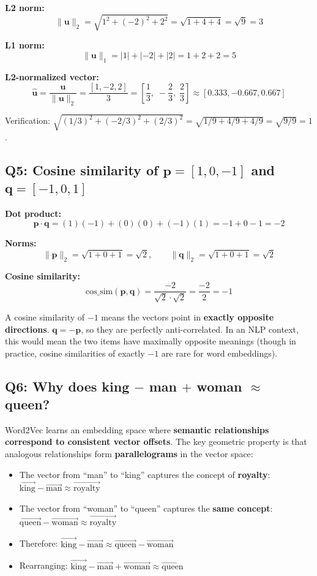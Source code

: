 \documentclass[11pt,a4paper]{article}
\begin{document}
\textbf{L2 norm:}
\[
\|\mathbf{u}\|_2 = \sqrt{1^2 + (-2)^2 + 2^2} = \sqrt{1 + 4 + 4} = \sqrt{9} = 3
\]

\textbf{L1 norm:}
\[
\|\mathbf{u}\|_1 = |1| + |-2| + |2| = 1 + 2 + 2 = 5
\]

\textbf{L2-normalized vector:}
\[
\hat{\mathbf{u}} = \frac{\mathbf{u}}{\|\mathbf{u}\|_2} = \frac{[1, -2, 2]}{3} = \left[\frac{1}{3},\; -\frac{2}{3},\; \frac{2}{3}\right] \approx [0.333, -0.667, 0.667]
\]

Verification: $\sqrt{(1/3)^2 + (-2/3)^2 + (2/3)^2} = \sqrt{1/9 + 4/9 + 4/9} = \sqrt{9/9} = 1$. \checkmark

\subsection*{Q5: Cosine similarity of $\mathbf{p} = [1, 0, -1]$ and $\mathbf{q} = [-1, 0, 1]$}

\textbf{Dot product:}
\[
\mathbf{p} \cdot \mathbf{q} = (1)(-1) + (0)(0) + (-1)(1) = -1 + 0 - 1 = -2
\]

\textbf{Norms:}
\[
\|\mathbf{p}\|_2 = \sqrt{1 + 0 + 1} = \sqrt{2}, \qquad \|\mathbf{q}\|_2 = \sqrt{1 + 0 + 1} = \sqrt{2}
\]

\textbf{Cosine similarity:}
\[
\text{cos\_sim}(\mathbf{p}, \mathbf{q}) = \frac{-2}{\sqrt{2} \cdot \sqrt{2}} = \frac{-2}{2} = -1
\]

A cosine similarity of $-1$ means the vectors point in \textbf{exactly opposite directions}. $\mathbf{q} = -\mathbf{p}$, so they are perfectly anti-correlated. In an NLP context, this would mean the two items have maximally opposite meanings (though in practice, cosine similarities of exactly $-1$ are rare for word embeddings).

\subsection*{Q6: Why does king $-$ man $+$ woman $\approx$ queen?}

Word2Vec learns an embedding space where \textbf{semantic relationships correspond to consistent vector offsets}. The key geometric property is that analogous relationships form \textbf{parallelograms} in the vector space:

\begin{itemize}[leftmargin=1.5em]
    \item The vector from ``man'' to ``king'' captures the concept of \textbf{royalty}: $\vec{\text{king}} - \vec{\text{man}} \approx \vec{\text{royalty}}$
    \item The vector from ``woman'' to ``queen'' captures the \textbf{same concept}: $\vec{\text{queen}} - \vec{\text{woman}} \approx \vec{\text{royalty}}$
    \item Therefore: $\vec{\text{king}} - \vec{\text{man}} \approx \vec{\text{queen}} - \vec{\text{woman}}$
    \item Rearranging: $\vec{\text{king}} - \vec{\text{man}} + \vec{\text{woman}} \approx \vec{\text{queen}}$
\end{itemize}
\end{document}
